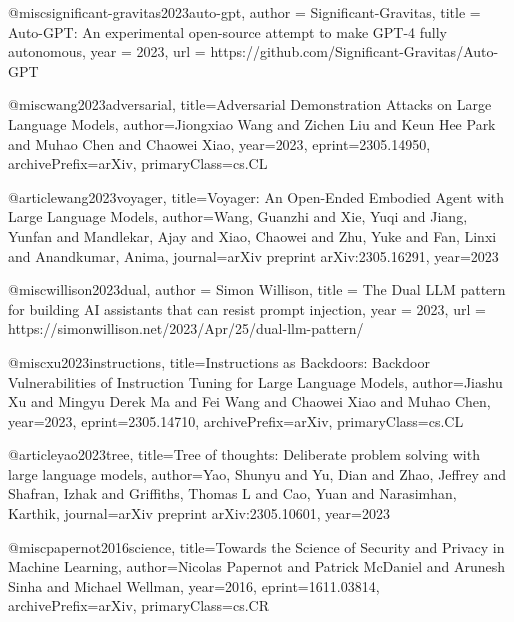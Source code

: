 @misc{significant-gravitas2023auto-gpt,
  author = {Significant-Gravitas},
  title = {Auto-GPT: An experimental open-source attempt to make GPT-4 fully autonomous},
  year = {2023},
  url = {https://github.com/Significant-Gravitas/Auto-GPT}
}

@misc{wang2023adversarial,
      title={Adversarial Demonstration Attacks on Large Language Models},
      author={Jiongxiao Wang and Zichen Liu and Keun Hee Park and Muhao Chen and Chaowei Xiao},
      year={2023},
      eprint={2305.14950},
      archivePrefix={arXiv},
      primaryClass={cs.CL}
}

@article{wang2023voyager,
  title={Voyager: An Open-Ended Embodied Agent with Large Language Models},
  author={Wang, Guanzhi and Xie, Yuqi and Jiang, Yunfan and Mandlekar, Ajay and Xiao, Chaowei and Zhu, Yuke and Fan, Linxi and Anandkumar, Anima},
  journal={arXiv preprint arXiv:2305.16291},
  year={2023}
}

@misc{willison2023dual,
  author = {Simon Willison},
  title = {The Dual LLM pattern for building AI assistants that can resist prompt injection},
  year = {2023},
  url = {https://simonwillison.net/2023/Apr/25/dual-llm-pattern/}
}

@misc{xu2023instructions,
      title={Instructions as Backdoors: Backdoor Vulnerabilities of Instruction Tuning for Large Language Models},
      author={Jiashu Xu and Mingyu Derek Ma and Fei Wang and Chaowei Xiao and Muhao Chen},
      year={2023},
      eprint={2305.14710},
      archivePrefix={arXiv},
      primaryClass={cs.CL}
}

@article{yao2023tree,
  title={Tree of thoughts: Deliberate problem solving with large language models},
  author={Yao, Shunyu and Yu, Dian and Zhao, Jeffrey and Shafran, Izhak and Griffiths, Thomas L and Cao, Yuan and Narasimhan, Karthik},
  journal={arXiv preprint arXiv:2305.10601},
  year={2023}
}



@misc{papernot2016science,
      title={Towards the Science of Security and Privacy in Machine Learning},
      author={Nicolas Papernot and Patrick McDaniel and Arunesh Sinha and Michael Wellman},
      year={2016},
      eprint={1611.03814},
      archivePrefix={arXiv},
      primaryClass={cs.CR}
}

